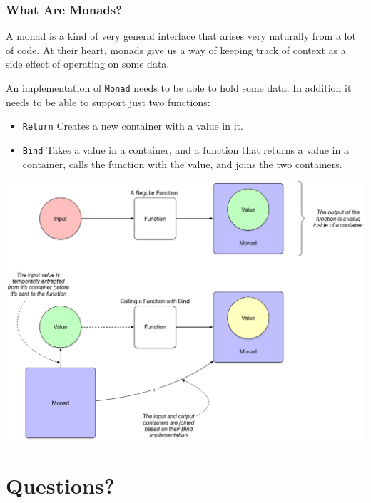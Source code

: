 \documentclass{beamer}
\begin{document}
\begin{frame}[fragile]
  \frametitle{What Are Monads?}
  A monad is a kind of very general interface that arises very
  naturally from a lot of code.  At their heart, monads give us a way
  of keeping track of context as a side effect of operating on some
  data.

  \par\pause
  An implementation of {\tt Monad} needs to be able to hold some
  data. In addition it needs to be able to support just two functions:
  \begin{itemize}
  \item {\tt Return} Creates a new container with a value in it.
  \item {\tt Bind} Takes a value in a container, and a function that
    returns a value in a container, calls the function with the value,
    and joins the two containers.
  \end{itemize}
\end{frame}

\begin{frame}
  \begin{center}
    \includegraphics[height=.85\paperheight]{images/small/monads_visualized}
  \end{center}
\end{frame}

\section{Questions?}
\end{document}
